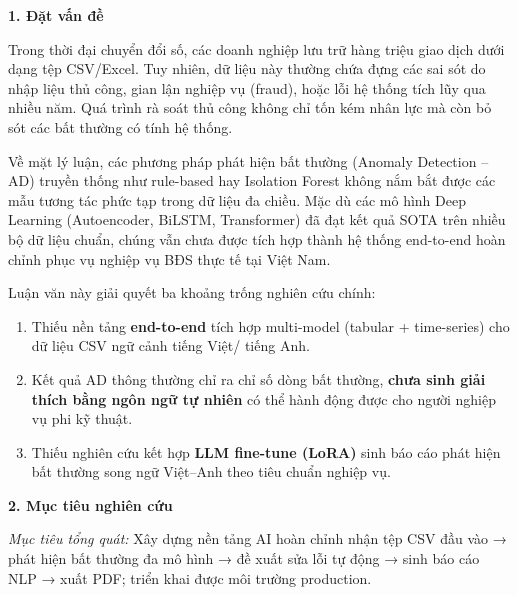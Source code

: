 
\setlength{\parskip}{10pt}

\noindent\textbf{1. Đặt vấn đề}

Trong thời đại chuyển đổi số, các doanh nghiệp lưu trữ hàng triệu giao dịch dưới dạng tệp CSV/Excel. Tuy nhiên, dữ liệu này thường chứa đựng các sai sót do nhập liệu thủ công, gian lận nghiệp vụ (fraud), hoặc lỗi hệ thống tích lũy qua nhiều năm. Quá trình rà soát thủ công không chỉ tốn kém nhân lực mà còn bỏ sót các bất thường có tính hệ thống.

Về mặt lý luận, các phương pháp phát hiện bất thường (Anomaly Detection -- AD) truyền thống như rule-based hay Isolation Forest không nắm bắt được các mẫu tương tác phức tạp trong dữ liệu đa chiều. Mặc dù các mô hình Deep Learning (Autoencoder, BiLSTM, Transformer) đã đạt kết quả SOTA trên nhiều bộ dữ liệu chuẩn, chúng vẫn chưa được tích hợp thành hệ thống end-to-end hoàn chỉnh phục vụ nghiệp vụ BĐS thực tế tại Việt Nam.

Luận văn này giải quyết ba khoảng trống nghiên cứu chính:
\begin{enumerate}
  \item Thiếu nền tảng \textbf{end-to-end} tích hợp multi-model (tabular + time-series) cho dữ liệu CSV ngữ cảnh tiếng Việt/ tiếng Anh.
  \item Kết quả AD thông thường chỉ ra chỉ số dòng bất thường, \textbf{chưa sinh giải thích bằng ngôn ngữ tự nhiên} có thể hành động được cho người nghiệp vụ phi kỹ thuật.
  \item Thiếu nghiên cứu kết hợp \textbf{LLM fine-tune (LoRA)} sinh báo cáo phát hiện bất thường song ngữ Việt--Anh theo tiêu chuẩn nghiệp vụ.
\end{enumerate}

\medskip
\noindent\textbf{2. Mục tiêu nghiên cứu}

\textit{Mục tiêu tổng quát:} Xây dựng nền tảng AI hoàn chỉnh nhận tệp CSV đầu vào → phát hiện bất thường đa mô hình → đề xuất sửa lỗi tự động → sinh báo cáo NLP → xuất PDF; triển khai được môi trường production.

